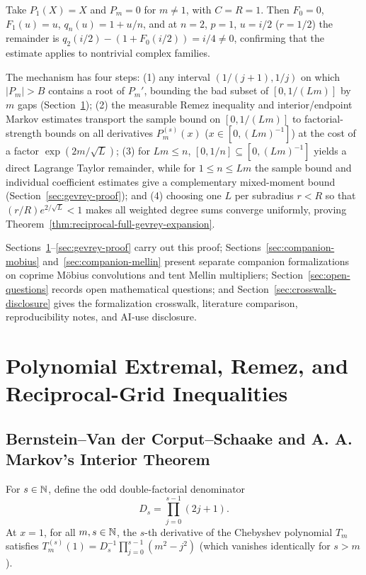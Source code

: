 \begin{remark}
\label{rem:gevrey-example-roadmap}
Take $P_1(X) = X$ and $P_m = 0$ for $m \ne 1$, with $C = R = 1$. Then $F_0 = 0$, $F_1(u) = u$, $q_n(u) = 1 + u/n$, and at $n = 2$, $p = 1$, $u = i/2$ ($r = 1/2$) the remainder is $q_2(i/2) - (1 + F_0(i/2)) = i/4 \ne 0$, confirming that the estimate applies to nontrivial complex families.

The mechanism has four steps: (1) any interval $(1/(j+1), 1/j)$ on which $|P_m| > B$ contains a root of $P_m'$, bounding the bad subset of $[0, 1/(Lm)]$ by $m$ gaps (Section~\ref{sec:extremal-remez}); (2) the measurable Remez inequality and interior/endpoint Markov estimates transport the sample bound on $[0, 1/(Lm)]$ to factorial-strength bounds on all derivatives $P_m^{(s)}(x)$ ($x \in [0, (Lm)^{-1}]$) at the cost of a factor $\exp(2m/\sqrt{L})$; (3) for $Lm \le n$, $[0, 1/n] \subseteq [0, (Lm)^{-1}]$ yields a direct Lagrange Taylor remainder, while for $1 \le n \le Lm$ the sample bound and individual coefficient estimates give a complementary mixed-moment bound (Section~\ref{sec:gevrey-proof}); and (4) choosing one $L$ per subradius $r < R$ so that $(r/R)e^{2/\sqrt{L}} < 1$ makes all weighted degree sums converge uniformly, proving Theorem~\ref{thm:reciprocal-full-gevrey-expansion}.

Sections~\ref{sec:extremal-remez}--\ref{sec:gevrey-proof} carry out this proof; Sections~\ref{sec:companion-mobius} and~\ref{sec:companion-mellin} present separate companion formalizations on coprime M\"obius convolutions and tent Mellin multipliers; Section~\ref{sec:open-questions} records open mathematical questions; and Section~\ref{sec:crosswalk-disclosure} gives the formalization crosswalk, literature comparison, reproducibility notes, and AI-use disclosure.
\end{remark}

\section{Polynomial Extremal, Remez, and Reciprocal-Grid Inequalities}
\label{sec:extremal-remez}

\subsection{Bernstein--Van der Corput--Schaake and A. A. Markov's Interior Theorem}

\begin{definition}
\label{def:markov-denom}
\leanok
For $s \in \mathbb{N}$, define the odd double-factorial denominator
\[
D_s = \prod_{j=0}^{s-1} (2j + 1).
\]
At $x = 1$, for all $m, s \in \mathbb{N}$, the $s$-th derivative of the Chebyshev polynomial $T_m$ satisfies
$T_m^{(s)}(1) = D_s^{-1} \prod_{j=0}^{s-1} (m^2 - j^2)$ (which vanishes identically for $s > m$).
\end{definition}

